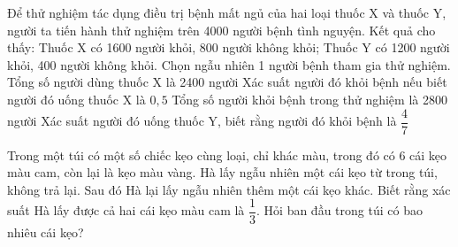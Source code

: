 \begin{vd} %
    Để thử nghiệm tác dụng điều trị bệnh mất ngủ của hai loại thuốc X và thuốc Y, người ta tiến hành thử nghiệm trên 4000 người bệnh tình nguyện. Kết quả cho thấy: Thuốc X có 1600 người khỏi, 800 người không khỏi; Thuốc Y có 1200 người khỏi, 400 người không khỏi. Chọn ngẫu nhiên 1 người bệnh tham gia thử nghiệm.
    \choiceTF
    {\True Tổng số người dùng thuốc X là 2400 người}
    { Xác suất người đó khỏi bệnh nếu biết người đó uống thuốc X là $0,5$}
    {\True Tổng số người khỏi bệnh trong thử nghiệm là 2800 người}
    { Xác suất người đó uống thuốc Y, biết rằng người đó khỏi bệnh là $\dfrac{4}{7}$}
\end{vd}
\begin{vd} %
    Trong một túi có một số chiếc kẹo cùng loại, chỉ khác màu, trong đó có 6 cái kẹo màu cam, còn lại là kẹo màu vàng. Hà lấy ngẫu nhiên một cái kẹo từ trong túi, không trả lại. Sau đó Hà lại lấy ngẫu nhiên thêm một cái kẹo khác. Biết rằng xác suất Hà lấy được cả hai cái kẹo màu cam là $\dfrac{1}{3}$. Hỏi ban đầu trong túi có bao nhiêu cái kẹo?
\end{vd}
